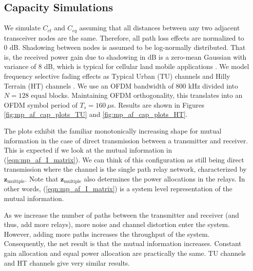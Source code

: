 \subsection{Capacity Simulations}
\label{subsec:mp_af_cs}

We simulate $C_{ct}$ and $C_{eq}$ assuming that all distances between any two adjacent transceiver nodes are the same.  Therefore, all path loss effects are normalized to $0$ dB.  Shadowing between nodes is assumed to be log-normally distributed.  That is, the received power gain due to shadowing in dB is a zero-mean Gaussian with variance of 8 dB, which is typical for cellular land mobile applications \cite{book:Stuber01}.  We model frequency selective fading effects as Typical Urban (TU) channels and Hilly Terrain (HT) channels \cite{book:Stuber01}.  We use an OFDM bandwidth of 800 kHz divided into $N=128$ equal blocks.  Maintaining OFDM orthogonality, this translates into an OFDM symbol period of $T_s = 160\:\mu$s.  Results are shown in Figures \ref{fig:mp_af_cap_plots_TU} and \ref{fig:mp_af_cap_plots_HT}.

The plots exhibit the familiar monotonically increasing shape for mutual information in the case of direct transmission between a transmitter and receiver.  This is expected if we look at the mutual information in (\ref{eqn:mp_af_I_matrix}).  We can think of this configuration as still being direct transmission where the channel is the single path relay network, characterized by $\mathbf{z}_{\mbox{multiple}}$.  Note that $\mathbf{z}_{\mbox{multiple}}$ also determines the power allocations in the relays.  In other words, (\ref{eqn:mp_af_I_matrix}) is a system level representation of the mutual information.

As we increase the number of paths between the transmitter and receiver (and thus, add more relays), more noise and channel distortion enter the system.  However, adding more paths increases the throughput of the system.  Consequently, the net result is that the mutual information increases.  Constant gain allocation and equal power allocation are practically the same.  TU channels and HT channels give very similar results.


